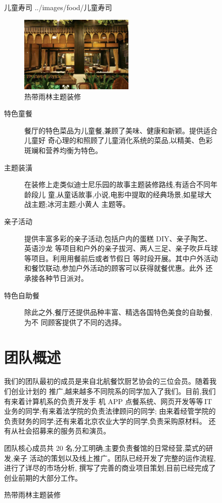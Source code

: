 \begin{figure}{儿童寿司} {../images/food/儿童寿司}
\begin{figure}[htbp]
\end{figure}
\begin{figure}[htbp]
        \centering
        \caption{热带雨林主题装修}
        \includegraphics[width=0.6\textwidth]{../images/interior/热带雨林}
\end{figure}

\begin{description}
\item[特色童餐] 餐厅的特色菜品为儿童餐,兼顾了美味、健康和新颖。提供适合儿童好
奇心理的和照顾了儿童消化系统的菜品,以精美、色彩斑斓和营养均衡为特色。

\item[主题装潢] 在装修上走类似迪士尼乐园的故事主题装修路线,有适合不同年龄段儿
童,从童话故事,小说,电影中提取的经典场景,如星球大战主题;冰河主题;小黄人
主题等。

\item[亲子活动] 提供丰富多彩的亲子活动,包括户内的蛋糕 DIY、亲子陶艺、英语沙龙
等项目和户外的亲子拔河、两人三足、亲子吹乒乓球等项目。利用用餐前后或者节假日
等时段开展。其中户外活动和餐饮联动,参加户外活动的顾客可以获得就餐优惠。此外
还承接各种节日派对。

\item[特色自助餐] 除此之外,餐厅还提供品种丰富、精选各国特色美食的自助餐,为不
同顾客提供了不同的选择。
\end{description}

\section{团队概述}
我们的团队最初的成员是来自北航餐饮厨艺协会的三位会员。随着我们创业计划的
推广,越来越多不同院系的同学加入了我们。目前,我们有来着计算机系的负责开发手
机 APP 点餐系统、网页开发等等\,IT\,业务的同学;有来着法学院的负责法律顾问的同学;
由来着经管学院的负责财务的同学;还有来着北京农业大学的同学,负责采购原材料。
还有从社会招募来的服务员和演员。

团队核心成员共 20 名,分工明确,主要负责餐馆的日常经营,菜式的研发,亲子
活动的策划以及线上推广。团队已经开发了完整的运作流程,进行了详尽的市场分析,
撰写了完善的商业项目策划,目前已经完成了创业前期的大部分工作。


\end{figure}
